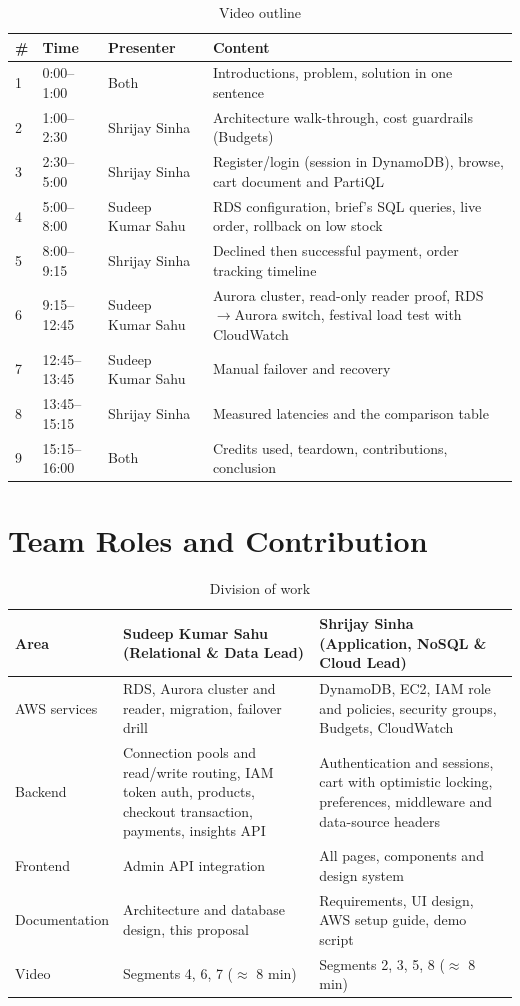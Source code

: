 \documentclass[11pt,a4paper]{article}
\newcommand{\memberA}{Sudeep Kumar Sahu}
\newcommand{\memberB}{Shrijay Sinha}
\begin{document}
\begin{table}[H]
\centering\small
\begin{tabularx}{\linewidth}{@{}l l l X@{}}
\toprule
\textbf{\#} & \textbf{Time} & \textbf{Presenter} & \textbf{Content}\\
\midrule
1 & 0:00--1:00 & Both & Introductions, problem, solution in one sentence\\
2 & 1:00--2:30 & \memberB & Architecture walk-through, cost guardrails (Budgets)\\
3 & 2:30--5:00 & \memberB & Register/login (session in DynamoDB), browse, cart document and PartiQL\\
4 & 5:00--8:00 & \memberA & RDS configuration, brief's SQL queries, live order, rollback on low stock\\
5 & 8:00--9:15 & \memberB & Declined then successful payment, order tracking timeline\\
6 & 9:15--12:45 & \memberA & Aurora cluster, read-only reader proof, RDS$\rightarrow$Aurora switch, festival load test with CloudWatch\\
7 & 12:45--13:45 & \memberA & Manual failover and recovery\\
8 & 13:45--15:15 & \memberB & Measured latencies and the comparison table\\
9 & 15:15--16:00 & Both & Credits used, teardown, contributions, conclusion\\
\bottomrule
\end{tabularx}
\caption{Video outline}
\end{table}

\section{Team Roles and Contribution}
\begin{table}[H]
\centering\small
\begin{tabularx}{\linewidth}{@{}l X X@{}}
\toprule
\textbf{Area} & \textbf{\memberA} (Relational \& Data Lead) & \textbf{\memberB} (Application, NoSQL \& Cloud Lead)\\
\midrule
AWS services & RDS, Aurora cluster and reader, migration, failover drill & DynamoDB, EC2, IAM role and policies, security groups, Budgets, CloudWatch\\
Backend & Connection pools and read/write routing, IAM token auth, products, checkout transaction, payments, insights API & Authentication and sessions, cart with optimistic locking, preferences, middleware and data-source headers\\
Frontend & Admin API integration & All pages, components and design system\\
Documentation & Architecture and database design, this proposal & Requirements, UI design, AWS setup guide, demo script\\
Video & Segments 4, 6, 7 ($\approx$ 8 min) & Segments 2, 3, 5, 8 ($\approx$ 8 min)\\
\bottomrule
\end{tabularx}
\caption{Division of work}
\end{table}
\end{document}
